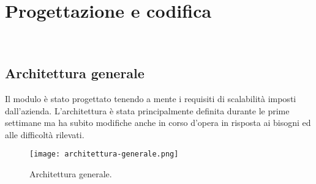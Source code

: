 
\chapter{Progettazione e codifica}
\label{cap:progettazione-codifica}

\\

\section{Architettura generale}

Il modulo è stato progettato tenendo a mente i requisiti di scalabilità imposti dall'azienda. L'architettura è stata principalmente definita durante le prime settimane ma ha subito modifiche anche in corso d'opera in risposta ai bisogni ed alle difficoltà rilevati.


\begin{figure}[!h] 
    \centering 
    \texttt{[image: architettura-generale.png]} 
    \caption{Architettura generale.}
\end{figure}